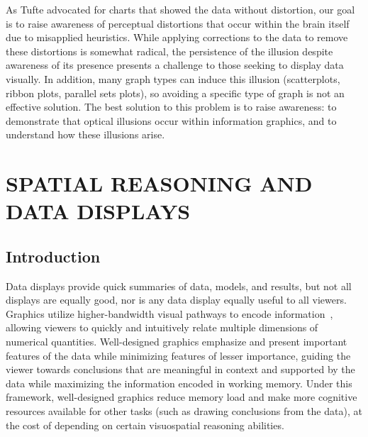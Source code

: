 \documentclass[11pt]{isuthesis}\usepackage[]{graphicx}\usepackage[]{color}
\newcommand\chaptocbreak{
	\addtocontents{toc}{\protect\needspace{4\baselineskip}}
	\addtocontents{lof}{\protect\needspace{2\baselineskip}}
	\addtocontents{lot}{\protect\needspace{2\baselineskip}}
}
\begin{document}
As Tufte advocated for charts that showed the data without distortion, our goal is to raise awareness of perceptual distortions that occur within the brain itself due to misapplied heuristics. While applying corrections to the data to remove these distortions is somewhat radical, the persistence of the illusion despite awareness of its presence presents a challenge to those seeking to display data visually. In addition, many graph types can induce this illusion (scatterplots, ribbon plots, parallel sets plots), so avoiding a specific type of graph is not an effective solution. The best solution to this problem is to raise awareness: to demonstrate that optical illusions occur within information graphics, and to understand how these illusions arise.  











\chaptocbreak


\graphicspath{{Figure/VisualAptitude/}{../Figure/VisualAptitude/}{Images/VisualAptitude/}{../Images/VisualAptitude/}}
\renewcommand{\floatpagefraction}{.99}




\chapter{SPATIAL REASONING AND DATA DISPLAYS}\label{VisualAptitude}\label{visualreasoning}

\section{Introduction}
Data displays provide quick summaries of data, models, and results, but not all displays are equally good, nor is any data display equally useful to all viewers. 
Graphics utilize higher-bandwidth visual pathways to encode information~\citep{baddeley1974working}, allowing viewers to quickly and intuitively relate multiple dimensions of numerical quantities.
Well-designed graphics emphasize and present important features of the data while minimizing  features of lesser importance, guiding the viewer towards conclusions that are meaningful in context and supported by the data while maximizing the information encoded in working memory. Under this framework, well-designed graphics reduce memory load and make more cognitive resources available for other tasks (such as drawing conclusions from the data), at the cost of depending on certain visuospatial reasoning abilities. 
\end{document}
